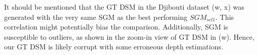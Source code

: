 \documentclass{isprs} %
\newcommand{\OurNeRFShort}{{SpS-NeRF}}
\begin{document}
It should be mentioned that the GT DSM in the Djibouti dataset (w, x) was generated with the very same SGM as the best performing $SGM_{scl1}$. This correlation might potentially bias the comparison. Additionally, SGM is susceptible to outliers, as shown in the zoom-in view of GT DSM in (w). Hence, our GT DSM is likely corrupt with some erroneous depth estimations.

\end{document}
